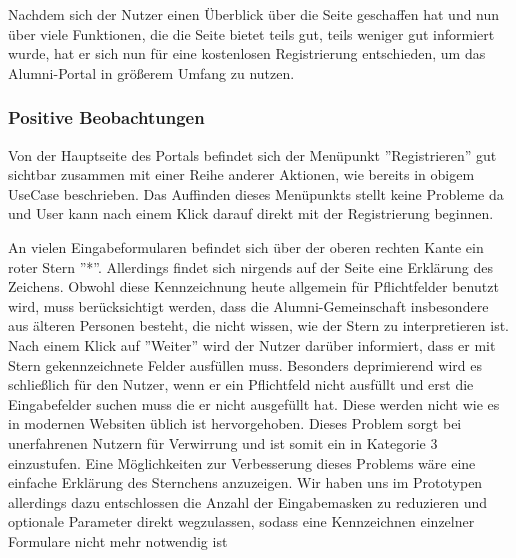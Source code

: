 Nachdem sich der Nutzer einen Überblick über die Seite geschaffen hat und nun über viele Funktionen, die die Seite
bietet teils gut, teils weniger gut informiert wurde, hat er sich nun für eine kostenlosen Registrierung entschieden, um das Alumni-Portal
in größerem Umfang zu nutzen.

\subsubsection*{Positive Beobachtungen}
Von der Hauptseite des Portals befindet sich der Menüpunkt ”Registrieren” gut sichtbar zusammen mit einer Reihe anderer Aktionen,
wie bereits in obigem UseCase beschrieben. Das Auffinden dieses Menüpunkts stellt keine Probleme da und User kann nach einem Klick darauf direkt mit der Registrierung
beginnen.


{
An vielen Eingabeformularen befindet sich über der oberen rechten Kante ein roter Stern ”*”. Allerdings findet sich nirgends auf der Seite eine Erklärung des Zeichens.
Obwohl diese Kennzeichnung heute allgemein für Pflichtfelder benutzt wird, muss berücksichtigt werden, dass die Alumni-Gemeinschaft insbesondere aus älteren Personen besteht, die nicht wissen, wie der Stern zu interpretieren ist. Nach einem Klick auf ”Weiter” wird der Nutzer darüber informiert, dass er mit Stern gekennzeichnete Felder ausfüllen muss.
}
{Besonders deprimierend wird es schließlich für den Nutzer, wenn er ein Pflichtfeld nicht ausfüllt und erst die Eingabefelder suchen muss die er nicht ausgefüllt hat. Diese werden nicht wie es in modernen Websiten üblich ist hervorgehoben. Dieses Problem sorgt bei unerfahrenen Nutzern für Verwirrung und ist somit ein in Kategorie 3 einzustufen.
}
{Eine Möglichkeiten zur Verbesserung dieses Problems wäre eine einfache Erklärung des Sternchens anzuzeigen. Wir haben uns im Prototypen allerdings dazu entschlossen die Anzahl der Eingabemasken zu reduzieren und optionale Parameter direkt wegzulassen, sodass eine Kennzeichnen einzelner Formulare nicht mehr notwendig ist
}

